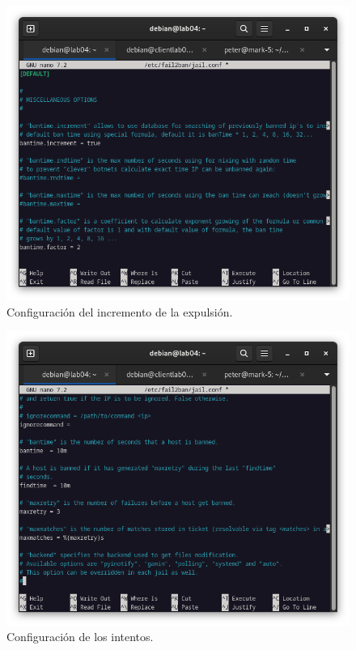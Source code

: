 \begin{figure}[H]
	\centering
	\includegraphics[scale=0.40]{01}
	\caption{Configuración del incremento de la expulsión.}
\end{figure}

\begin{figure}[H]
	\centering
	\includegraphics[scale=0.40]{02}
	\caption{Configuración de los intentos.}
\end{figure}


